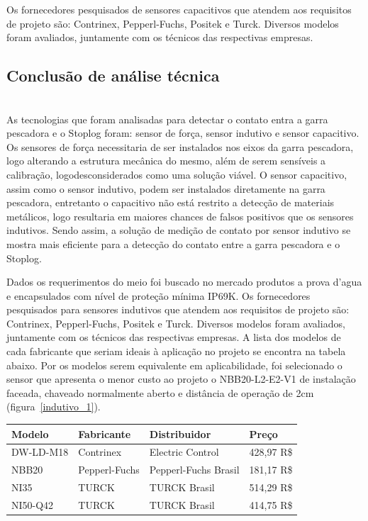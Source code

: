 Os fornecedores pesquisados de sensores capacitivos que atendem aos requisitos de projeto são: Contrinex, Pepperl-Fuchs, Positek e Turck. Diversos modelos foram avaliados, juntamente com os técnicos das respectivas empresas.



 \subsection{Conclusão de análise técnica}\mbox{}\\


As tecnologias que foram analisadas para detectar o contato entra a garra pescadora e o Stoplog foram: sensor de força, sensor indutivo e sensor capacitivo. Os sensores de força necessitaria de ser instalados nos eixos da garra pescadora, logo alterando a estrutura mecânica do mesmo, além de serem sensíveis a calibração, logodesconsiderados como uma solução viável. O sensor capacitivo, assim como o sensor indutivo, podem ser instalados diretamente na garra pescadora, entretanto o capacitivo não está restrito a detecção de materiais metálicos, logo resultaria em maiores chances de falsos positivos que os sensores indutivos.  Sendo assim, a solução de medição de contato por sensor indutivo se mostra mais eficiente para a detecção do contato entre a garra pescadora e o Stoplog. 

Dados os requerimentos do meio foi buscado no mercado produtos a prova d’agua e encapsulados com nível de proteção mínima IP69K. Os fornecedores pesquisados para sensores indutivos que atendem aos requisitos de projeto são: Contrinex, Pepperl-Fuchs, Positek e Turck. Diversos modelos foram avaliados, juntamente com os técnicos das respectivas empresas. A lista dos modelos de cada fabricante que seriam ideais à aplicação no projeto se encontra na tabela abaixo. Por os modelos serem equivalente em aplicabilidade, foi selecionado o sensor que apresenta o menor custo ao projeto o NBB20-L2-E2-V1 de instalação faceada, chaveado normalmente aberto e distância de operação de 2cm (figura~\ref{indutivo_1}).


\begin{center}
    \begin{tabular}{| l | l | l | l | }
    \hline
	{\bf Modelo} & 	{\bf Fabricante} &		{\bf Distribuidor}	&	{\bf Preço} \\  \hline
	DW-LD-M18&		Contrinex&			Electric Control&		428,97 R{\$} \\  \hline
	NBB20&			Pepperl-Fuchs&		Pepperl-Fuchs Brasil&	181,17 R{\$} \\  \hline
	NI35&			TURCK&				TURCK Brasil&			514,29 R{\$} \\  \hline
	NI50-Q42&		TURCK&				TURCK Brasil&			414,75 R{\$} \\ \hline
\hline 
\end{tabular}
\end{center}

